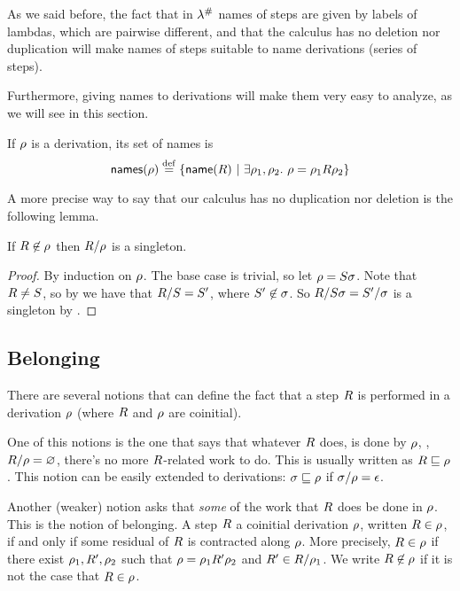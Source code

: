 
As we said before, the fact that in $\lambda^{\mathtt{\#}}$ names of steps
are given by labels of lambdas, which are pairwise different,
and that the calculus has no deletion nor duplication will
make names of steps suitable to name derivations (\ie series of steps).

Furthermore, giving names to derivations will make them very easy to analyze, as we
will see in this section.

\begin{definition}
If $\rho$ is a derivation, its set of names is
\[
  \mathsf{names}(\rho) \overset{\mathrm{def}}{=} \{\mathsf{name}(R) \ |\  \exists \rho_1,\rho_2.\ \rho = \rho_1R\rho_2\}
\]
\end{definition}

A more precise way to say that our calculus has no duplication nor deletion is the following lemma.

\begin{lemma}[Permanence]
If $R \not\in \rho$ then $R/\rho$ is a singleton.
\end{lemma}
\begin{proof}
By induction on $\rho$. The base case is trivial, so let $\rho = S\sigma$. 
Note that $R \neq S$, so by 
we have that $R/S = S'$,
where $S' \not\in \sigma$.
So $R/S\sigma = S'/\sigma$ is a singleton by \ih.
\end{proof}

\subsection*{Belonging}

There are several notions that can define the fact that a step $R$ is performed in
a derivation $\rho$ (where $R$ and $\rho$ are coinitial).

One of this notions is the one that says that whatever $R$ does,
is done by $\rho$, \ie, $R / \rho = \varnothing$,
there's no more $R$-related work to do. This is usually written as
$R \sqsubseteq \rho$. This notion can be easily extended to derivations:
$\sigma \sqsubseteq \rho$ if $\sigma / \rho = \epsilon$.

Another (weaker) notion asks that \emph{some} of the work that $R$ does be
done in $\rho$. This is the notion of belonging.
A step $R$  a coinitial derivation $\rho$,
written $R \in \rho$,
if and only if some residual of $R$ is contracted along $\rho$. 
More precisely, $R \in \rho$ if there exist $\rho_1,R',\rho_2$
such that $\rho = \rho_1R'\rho_2$ and $R' \in R/\rho_1$.
We write $R \not\in \rho$ if it is not the case that $R \in \rho$.

